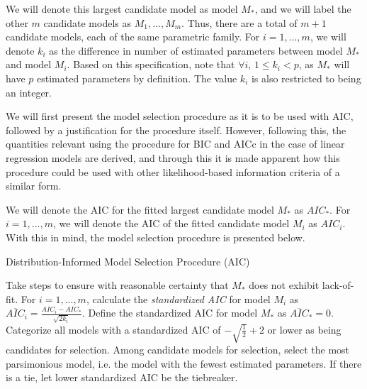 		We will denote this largest candidate model as model $M_*$, and we will label the other $m$ candidate models as $M_1,...,M_m$. Thus, there are a total of $m+1$ candidate
		models, each of the same parametric family. For $i=1,...,m$, we will denote $k_i$ as the difference in number of estimated parameters between model $M_*$ and model
		$M_i$. Based on this specification, note that $\forall i$, $1 \le k_i < p$, as $M_*$ will have $p$ estimated parameters by definition. The value $k_i$ is also restricted to
		being an integer.

		We will first present the model selection procedure as it is to be used with AIC, followed by a justification for the procedure itself. However, following this, the quantities relevant using the procedure for BIC and AICc in the case of linear regression models are derived, and through this
		it is made apparent how this procedure could be used with other likelihood-based information criteria of a similar form.

		We will denote the AIC for the fitted largest candidate model $M_*$ as $AIC_*$. For $i=1,...,m$, we will denote the AIC of the fitted candidate model $M_i$ as 
		$AIC_i$. With this in mind, the model selection procedure is presented below.

		\pagebreak

		\begin{algorithm}[H]
			\caption{Distribution-Informed Model Selection Procedure (AIC)}
			\begin{algorithmic}[1]
			  \State Take steps to ensure with reasonable certainty that $M_*$ does not exhibit lack-of-fit.
			  \State For $i = 1,...,m$, calculate the \textit{standardized AIC} for model $M_i$ as 
			  $\overline{AIC}_i = \frac{AIC_i - AIC_*}{\sqrt{2k_i}}$. Define the standardized AIC for model
			  $M_*$ as $\overline{AIC}_* = 0$.
			  \State Categorize all models with a standardized AIC of $ -\sqrt{\frac{1}{2}} + 2$ or lower as
			  being candidates for selection.
			  \State Among candidate models for selection, select the most parsimonious model, i.e. the model
			  with the fewest estimated parameters. If there is a tie, let lower standardized AIC be the
			  tiebreaker.
			\end{algorithmic}
		\end{algorithm}

